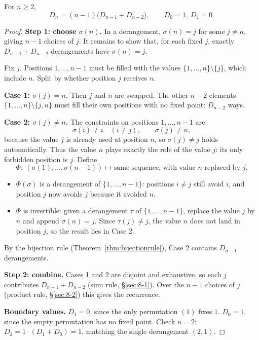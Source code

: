\documentclass[11pt]{article}
\begin{document}
\begin{theorem}
\label{thm:derangerec}
For $n\ge2$,
\[
D_n = (n-1)\big(D_{n-1}+D_{n-2}\big), \qquad D_0=1,\ D_1=0.
\]
\end{theorem}
\begin{proof}
\textbf{Step 1: choose $\sigma(n)$.} In a derangement, $\sigma(n)=j$ for some $j\ne n$, giving $n-1$ choices of $j$. It remains to show that, for each fixed $j$, exactly $D_{n-1}+D_{n-2}$ derangements have $\sigma(n)=j$.

\medskip
Fix $j$. Positions $1,\dots,n-1$ must be filled with the values $\{1,\dots,n\}\setminus\{j\}$, which include $n$. Split by whether position $j$ receives $n$.

\medskip
\textbf{Case 1: $\sigma(j)=n$.} Then $j$ and $n$ are swapped. The other $n-2$ elements $\{1,\dots,n\}\setminus\{j,n\}$ must fill their own positions with no fixed point: $D_{n-2}$ ways.

\medskip
\textbf{Case 2: $\sigma(j)\ne n$.} The constraints on positions $1,\dots,n-1$ are
\[
\sigma(i)\ne i\quad (i\ne j), \qquad \sigma(j)\ne n,
\]
because the value $j$ is already used at position $n$, so $\sigma(j)\ne j$ holds automatically. Thus the value $n$ plays exactly the role of the value $j$: its only forbidden position is $j$. Define
\[
\Phi:\ (\sigma(1),\dots,\sigma(n-1)) \longmapsto \text{same sequence, with value } n \text{ replaced by } j.
\]
\begin{itemize}
  \item $\Phi(\sigma)$ is a derangement of $\{1,\dots,n-1\}$: positions $i\ne j$ still avoid $i$, and position $j$ now avoids $j$ because it avoided $n$.
  \item $\Phi$ is invertible: given a derangement $\tau$ of $\{1,\dots,n-1\}$, replace the value $j$ by $n$ and append $\sigma(n)=j$. Since $\tau(j)\ne j$, the value $n$ does not land in position $j$, so the result lies in Case 2.
\end{itemize}
By the bijection rule (Theorem~\ref{thm:bijectionrule}), Case 2 contains $D_{n-1}$ derangements.

\medskip
\textbf{Step 2: combine.} Cases 1 and 2 are disjoint and exhaustive, so each $j$ contributes $D_{n-1}+D_{n-2}$ (sum rule, \S\ref{sec:8-1}). Over the $n-1$ choices of $j$ (product rule, \S\ref{sec:8-2}) this gives the recurrence.

\medskip
\textbf{Boundary values.} $D_1=0$, since the only permutation $(1)$ fixes $1$. $D_0=1$, since the empty permutation has no fixed point. Check $n=2$: $D_2=1\cdot(D_1+D_0)=1$, matching the single derangement $(2,1)$.
\end{proof}
\end{document}
